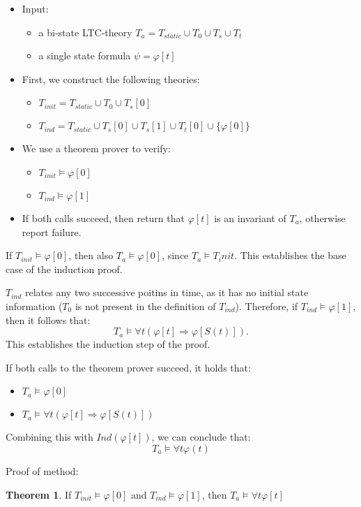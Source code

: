 \documentclass[10pt,a4paper]{article}
\theoremstyle{definition}
\newtheorem{theorem}{Theorem}
\begin{document}
\begin{itemize}
	\item Input:
	\begin{itemize}
		\item a bi-state LTC-theory $T_a = T_{static} \cup T_0 \cup T_s \cup T_t$
		\item a single state formula $\psi = \varphi[t]$
	\end{itemize}
	\item First, we construct the following theories:
		\begin{itemize}
			\item $T_{init} = T_{static} \cup T_0 \cup T_s[0]$
			\item $T_{ind} = T_{static} \cup T_s[0] \cup T_s[1] \cup T_t[0] \cup \{\varphi[0]\}$
		\end{itemize}
	\item We use a theorem prover to verify:
		\begin{itemize}
			\item $T_{init} \models \varphi[0]$
			\item $T_{ind} \models \varphi[1]$
		\end{itemize}
	\item If both calls succeed, then return that $\varphi[t]$ is an invariant of $T_a$, otherwise report failure.
\end{itemize}

If $T_{init} \models \varphi[0]$, then also $T_a \models \varphi[0]$, since $T_a \models T_init$. This establishes the base case of the induction proof. 

$T_{ind}$ relates any two successive poitins in time, as it has no initial state information ($T_0$ is not present in the definition of $T_{ind}$). Therefore, if $T_{ind} \models \varphi[1]$, then it follows that: $$T_a \models \forall t (\varphi[t] \Rightarrow \varphi [S(t)]).$$ This establishes the induction step of the proof.

If both calls to the theorem prover succeed, it holds that: 
\begin{itemize}
	\item $T_a \models \varphi[0]$
	\item $T_a \models \forall t (\varphi[t] \Rightarrow \varphi [S(t)])$
\end{itemize}
Combining this with $Ind(\varphi[t])$, we can conclude that: $$T_a \models \forall t \varphi(t)$$

Proof of method:

\begin{theorem}
If $T_{init} \models \varphi[0]$ and $T_{ind} \models \varphi[1]$, then $T_a \models \forall t \varphi[t]$
\end{theorem}
\end{document}

